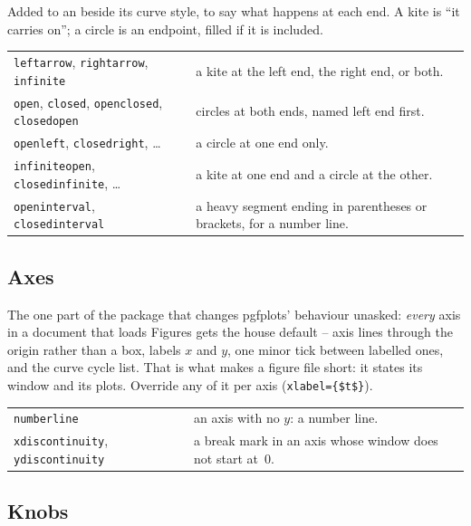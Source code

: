 Added to an  beside its curve style, to say what happens at
each end. A kite is ``it carries on''; a circle is an endpoint, filled if
it is included.

\begin{center}
\begin{tabularx}{\linewidth}{@{}l Y@{}}
\texttt{leftarrow}, \texttt{rightarrow}, \texttt{infinite} &
  a kite at the left end, the right end, or both.\\
\texttt{open}, \texttt{closed}, \texttt{openclosed}, \texttt{closedopen} &
  circles at both ends, named left end first.\\
\texttt{openleft}, \texttt{closedright}, \ldots & a circle at one end
  only.\\
\texttt{infiniteopen}, \texttt{closedinfinite}, \ldots & a kite at one end
  and a circle at the other.\\
\texttt{openinterval}, \texttt{closedinterval} & a heavy segment ending in
  parentheses or brackets, for a number line.\\
\end{tabularx}
\end{center}

\subsection*{Axes}

The one part of the package that changes pgfplots' behaviour unasked:
\emph{every} axis in a document that loads Figures gets the house default
-- axis lines through the origin rather than a box, labels $x$ and $y$,
one minor tick between labelled ones, and the curve cycle list. That is
what makes a figure file short: it states its window and its plots.
Override any of it per axis (\texttt{xlabel=\{\$t\$\}}).

\begin{center}
\begin{tabularx}{\linewidth}{@{}l Y@{}}
\texttt{numberline} & an axis with no $y$: a number line.\\
\texttt{xdiscontinuity}, \texttt{ydiscontinuity} & a break mark in an
  axis whose window does not start at~0.\\
\end{tabularx}
\end{center}

\subsection*{Knobs}

